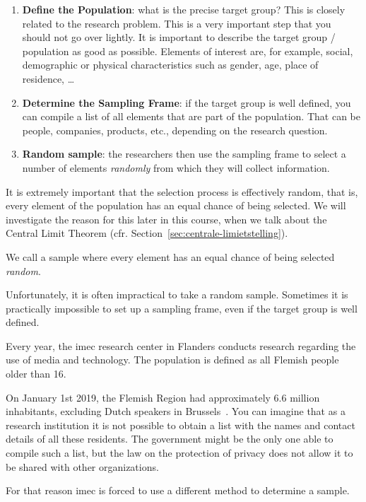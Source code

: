 \begin{enumerate}
    \item \textbf{Define the Population}: what is the precise target group? This is closely related to the research problem. This is a very important step that you should not go over lightly. It is important to describe the target group / population as good as possible. Elements of interest are, for example, social, demographic or physical characteristics such as gender, age, place of residence, \dots
    \item \textbf{Determine the Sampling Frame}: if the target group is well defined, you can compile a list of all elements that are part of the population. That can be people, companies, products, etc., depending on the research question.
    \item \textbf{Random sample}: the researchers then use the sampling frame to select a number of elements \textit{randomly} from which they will collect information.
\end{enumerate}

It is extremely important that the selection process is effectively random, that is, every element of the population has an equal chance of being selected. We will investigate the reason for this later in this course, when we talk about the Central Limit Theorem (cfr. Section~\ref{sec:centrale-limietstelling}).

\begin{definition}
    We call a sample where every element has an equal chance of being selected \emph{random}.
\end{definition}

Unfortunately, it is often impractical to take a random sample. Sometimes it is practically impossible to set up a sampling frame, even if the target group is well defined.

\begin{example}
    Every year, the imec research center in Flanders conducts research regarding the use of media and technology. The population is defined as all Flemish people older than 16. 
    
    On January 1st 2019, the Flemish Region had approximately 6.6 million inhabitants, excluding Dutch speakers in Brussels~\autocite{Statbel2019}. You can imagine that as a research institution it is not possible to obtain a list with the names and contact details of all these residents. The government might be the only one able to compile such a list, but the law on the protection of privacy does not allow it to be shared with other organizations.
    
    For that reason imec is forced to use a different method to determine a sample.
\end{example}

